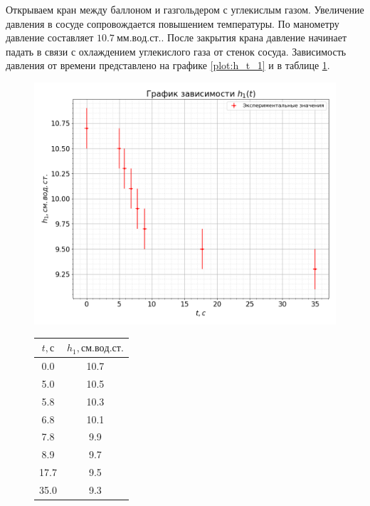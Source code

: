 \documentclass[a4paper, 12pt]{article}
\begin{document}
			Открываем кран между баллоном и газгольдером с углекислым газом. Увеличение давления в сосуде сопровождается повышением температуры. По манометру давление составляет $10.7~мм.вод.ст.$. После закрытия крана давление начинает падать в связи с охлаждением углекислого газа от стенок сосуда. Зависимость давления от времени представлено на графике \ref{plot:h_t_1} и в таблице \ref{table:h_t_1}.

			\begin{figure}[ht!]
				\begin{minipage}[c]{.6\linewidth}
					\centering
					\includegraphics[width=1.0\linewidth]{img/plot_h1_t_1.png}
					\label{plot:h_t_1}
				\end{minipage}\hfill
				\begin{minipage}[c]{.3\linewidth}
					\centering
					\begin{tabular}{|c|c|}
						\hline

						$t, с$ & $h_1, см.вод.ст.$\\ \hline
						0.0 & 10.7\\ \hline
						5.0 & 10.5\\ \hline
						5.8 & 10.3\\ \hline
						6.8 & 10.1\\ \hline
						7.8 & 9.9\\ \hline
						8.9 & 9.7\\ \hline
						17.7 & 9.5\\ \hline
						35.0 & 9.3\\ \hline

					\end{tabular}
					\label{table:h_t_1}
				\end{minipage}
			\end{figure}
\end{document}
